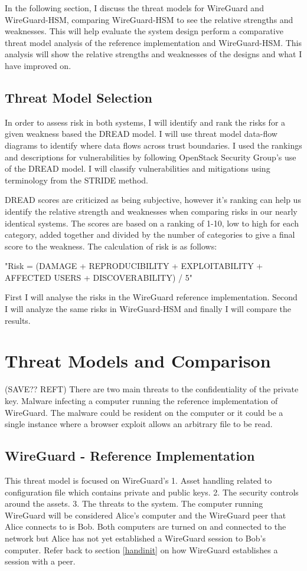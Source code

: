 \documentclass [11pt, proquest] {uwthesis}[2020/02/24]
\begin{document}
In the following section, I discuss the threat models for WireGuard and WireGuard-HSM, comparing WireGuard-HSM to see the relative strengths and weaknesses. This will help evaluate the system design perform a comparative threat model analysis of the reference implementation and WireGuard-HSM. This analysis will show the relative strengths and weaknesses of the designs and what I have improved on.

\section{Threat Model Selection}
In order to assess risk in both systems, I will identify and rank the risks for a given weakness based the DREAD model. I will use threat model data-flow diagrams to identify where data flows across trust boundaries.
I used the rankings and descriptions for vulnerabilities by following OpenStack Security Group's use of the DREAD model\cite{noauthor_securityossa-metrics_2022}. I will classify vulnerabilities and mitigations using terminology from the STRIDE method\cite{hernan_uncover_2019}.

DREAD scores are criticized as being subjective, however it's ranking can help us identify the relative strength and weaknesses when comparing risks in our nearly identical systems. The scores are based on a ranking of 1-10, low to high for each category, added together and divided by the number of categories to give a final score to the weakness. The calculation of risk is as follows:

"Risk = (DAMAGE + REPRODUCIBILITY + EXPLOITABILITY + AFFECTED USERS + DISCOVERABILITY) / 5"

First I will analyse the risks in the WireGuard reference implementation. Second I will analyze the same risks in WireGuard-HSM and finally I will compare the results.

\chapter {Threat Models and Comparison}

(SAVE?? REFT)
There are two main threats to the confidentiality of the private key. Malware infecting a computer running the reference implementation of WireGuard. The malware could be resident on the computer or it could be a single instance where a browser exploit allows an arbitrary file to be read. 

\section {WireGuard - Reference Implementation}
\label{wg-ref-analysis}
This threat model is focused on WireGuard's 1. Asset handling related to configuration file which contains private and public keys. 2. The security controls around the assets. 3. The threats to the system. The computer running WireGuard will be considered Alice's computer and the WireGuard peer that Alice connects to is Bob. Both computers are turned on and connected to the network but Alice has not yet established a WireGuard session to Bob's computer. Refer back to section \ref{handinit} on how WireGuard establishes a session with a peer. 
\end{document}
